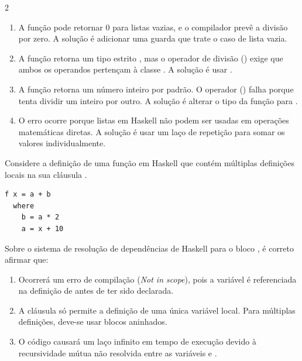 \documentclass[a4paper,10pt,brazil]{article}
\begin{document}
\begin{multicols}{2}
\begin{enumerate}
  \item A função  pode retornar 0 para listas vazias, e o compilador prevê a divisão por zero. A solução é adicionar uma guarda que trate o caso de lista vazia.

  \item A função  retorna um tipo estrito , mas o operador de divisão (\haskellinline{/}) exige que ambos os operandos pertençam à classe . A solução é usar .

  \item A função  retorna um número inteiro por padrão. O operador (\haskellinline{/}) falha porque tenta dividir um inteiro por outro. A solução é alterar o tipo da função para .

  \item O erro ocorre porque listas em Haskell não podem ser usadas em operações matemáticas diretas. A solução é usar um laço de repetição  para somar os valores individualmente.


\end{enumerate}

Considere a definição de uma função  em Haskell que contém múltiplas definições locais na sua cláusula . 
\begin{verbatim}
f x = a + b
  where
    b = a * 2
    a = x + 10
\end{verbatim}
Sobre o sistema de resolução de dependências de Haskell para o bloco , é correto afirmar que:

\begin{enumerate}
  \item Ocorrerá um erro de compilação (\emph{Not in scope}), pois a variável  é referenciada na definição de  antes de ter sido declarada.

  \item A cláusula  só permite a definição de uma única variável local. Para múltiplas definições, deve-se usar blocos  aninhados.

  \item O código causará um laço infinito em tempo de execução devido à recursividade mútua não resolvida entre as variáveis  e .


\end{enumerate}
\end{multicols}
\end{document}
